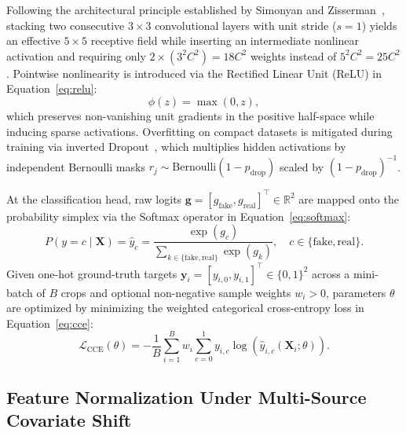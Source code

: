 Following the architectural principle established by Simonyan and Zisserman~\cite{simonyan2015very}, stacking two consecutive $3\times3$ convolutional layers with unit stride ($s=1$) yields an effective $5\times5$ receptive field while inserting an intermediate nonlinear activation and requiring only $2 \times (3^2 C^2) = 18 C^2$ weights instead of $5^2 C^2 = 25 C^2$. Pointwise nonlinearity is introduced via the Rectified Linear Unit (ReLU) in Equation~\eqref{eq:relu}:
\begin{equation}
\label{eq:relu}
    \phi(z) = \max(0, z),
\end{equation}
which preserves non-vanishing unit gradients in the positive half-space while inducing sparse activations. Overfitting on compact datasets is mitigated during training via inverted Dropout~\cite{srivastava2014dropout}, which multiplies hidden activations by independent Bernoulli masks $r_j \sim \text{Bernoulli}(1 - p_{\text{drop}})$ scaled by $(1 - p_{\text{drop}})^{-1}$.

At the classification head, raw logits $\mathbf{g} = [g_{\text{fake}}, g_{\text{real}}]^\top \in \mathbb{R}^2$ are mapped onto the probability simplex via the Softmax operator in Equation~\eqref{eq:softmax}:
\begin{equation}
\label{eq:softmax}
    P(y = c \mid \mathbf{X}) = \hat{y}_c = \frac{\exp(g_c)}{\sum_{k \in \{\text{fake}, \text{real}\}} \exp(g_k)}, \quad c \in \{\text{fake}, \text{real}\}.
\end{equation}
Given one-hot ground-truth targets $\mathbf{y}_i = [y_{i,0}, y_{i,1}]^\top \in \{0, 1\}^2$ across a mini-batch of $B$ crops and optional non-negative sample weights $w_i > 0$, parameters $\theta$ are optimized by minimizing the weighted categorical cross-entropy loss in Equation~\eqref{eq:cce}:
\begin{equation}
\label{eq:cce}
    \mathcal{L}_{\text{CCE}}(\theta) = -\frac{1}{B} \sum_{i=1}^{B} w_i \sum_{c=0}^{1} y_{i,c} \log \left(\hat{y}_{i,c}(\mathbf{X}_i; \theta)\right).
\end{equation}

\subsection{Feature Normalization Under Multi-Source Covariate Shift}

